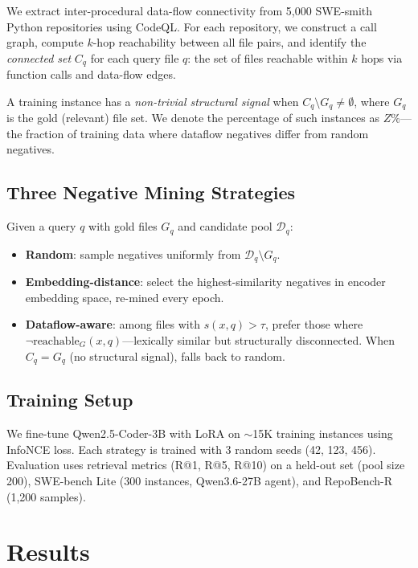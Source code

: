\documentclass[11pt]{article}
\begin{document}
We extract inter-procedural data-flow connectivity from 5,000 SWE-smith Python repositories using CodeQL. For each repository, we construct a call graph, compute $k$-hop reachability between all file pairs, and identify the \emph{connected set} $C_q$ for each query file $q$: the set of files reachable within $k$ hops via function calls and data-flow edges.

A training instance has a \emph{non-trivial structural signal} when $C_q \setminus G_q \neq \emptyset$, where $G_q$ is the gold (relevant) file set. We denote the percentage of such instances as $Z\%$---the fraction of training data where dataflow negatives differ from random negatives.

\subsection{Three Negative Mining Strategies}

Given a query $q$ with gold files $G_q$ and candidate pool $\mathcal{D}_q$:

\begin{itemize}[leftmargin=*,itemsep=2pt]
    \item \textbf{Random}: sample negatives uniformly from $\mathcal{D}_q \setminus G_q$.
    \item \textbf{Embedding-distance}: select the highest-similarity negatives in encoder embedding space, re-mined every epoch.
    \item \textbf{Dataflow-aware}: among files with $s(x,q) > \tau$, prefer those where $\neg\text{reachable}_G(x,q)$---lexically similar but structurally disconnected. When $C_q = G_q$ (no structural signal), falls back to random.
\end{itemize}

\subsection{Training Setup}

We fine-tune Qwen2.5-Coder-3B with LoRA on $\sim$15K training instances using InfoNCE loss. Each strategy is trained with 3 random seeds (42, 123, 456). Evaluation uses retrieval metrics (R@1, R@5, R@10) on a held-out set (pool size 200), SWE-bench Lite (300 instances, Qwen3.6-27B agent), and RepoBench-R (1,200 samples).

\section{Results}
\label{sec:main_results}
\end{document}
